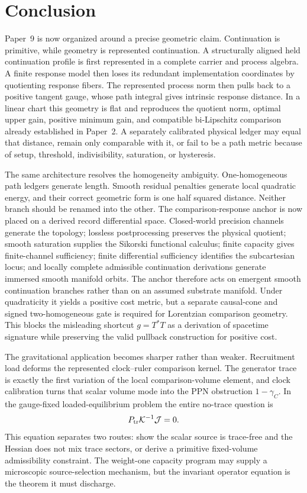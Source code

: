 \documentclass[11pt]{article}
\theoremstyle{remark}
\newcommand{\Ptr}{P_{\rm tr}}
\begin{document}
\section{Conclusion}

Paper~9 is now organized around a precise geometric claim.  Continuation is primitive, while geometry is represented continuation.  A structurally aligned held continuation profile is first represented in a complete carrier and process algebra.  A finite response model then loses its redundant implementation coordinates by quotienting response fibers.  The represented process norm then pulls back to a positive tangent gauge, whose path integral gives intrinsic response distance.  In a linear chart this geometry is flat and reproduces the quotient norm, optimal upper gain, positive minimum gain, and compatible bi-Lipschitz comparison already established in Paper~2.  A separately calibrated physical ledger may equal that distance, remain only comparable with it, or fail to be a path metric because of setup, threshold, indivisibility, saturation, or hysteresis.

The same architecture resolves the homogeneity ambiguity.  One-homogeneous path ledgers generate length.  Smooth residual penalties generate local quadratic energy, and their correct geometric form is one half squared distance.  Neither branch should be renamed into the other.  The comparison-response anchor is now placed on a derived record differential space.  Closed-world precision channels generate the topology; lossless postprocessing preserves the physical quotient; smooth saturation supplies the Sikorski functional calculus; finite capacity gives finite-channel sufficiency; finite differential sufficiency identifies the subcartesian locus; and locally complete admissible continuation derivations generate immersed smooth manifold orbits.  The anchor therefore acts on emergent smooth continuation branches rather than on an assumed substrate manifold.  Under quadraticity it yields a positive cost metric, but a separate causal-cone and signed two-homogeneous gate is required for Lorentzian comparison geometry.  This blocks the misleading shortcut $g=T^*T$ as a derivation of spacetime signature while preserving the valid pullback construction for positive cost.

The gravitational application becomes sharper rather than weaker.  Recruitment load deforms the represented clock--ruler comparison kernel.  The generator trace is exactly the first variation of the local comparison-volume element, and clock calibration turns that scalar volume mode into the PPN obstruction $1-\gamma_C$.  In the gauge-fixed loaded-equilibrium problem the entire no-trace question is
\[
        \Ptr\mathcal K^{-1}\mathcal J=0.
\]
This equation separates two routes: show the scalar source is trace-free and the Hessian does not mix trace sectors, or derive a primitive fixed-volume admissibility constraint.  The weight-one capacity program may supply a microscopic source-selection mechanism, but the invariant operator equation is the theorem it must discharge.
\end{document}
